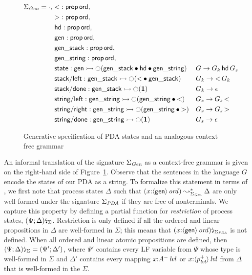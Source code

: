 \begin{figure}
\begin{align*}
 \Sigma_{\it Gen} = \cdot, 
~&{\sf <} : {\sf prop}\,{\sf ord},\\
~&{\sf >} : {\sf prop}\,{\sf ord},\\
~&{\sf hd} : {\sf prop}\,{\sf ord},\\
~&{\sf gen} : {\sf prop}\,{\sf ord},\\
~&{\sf gen\_stack} : {\sf prop}\,{\sf ord},\\
~&{\sf gen\_string} : {\sf prop}\,{\sf ord},\\
~&{\sf state} : {\sf gen} 
       \rightarrowtail {\ocircle}({\sf gen\_stack} \mathbin{\bullet} {\sf hd} 
                         \mathbin{\bullet} {\sf gen\_string})
&& G \rightarrow G_k\,{\sf hd}\,G_s\\
~&{\sf stack/left} : {\sf gen\_stack} 
       \rightarrowtail {\ocircle}({\sf <} \mathbin{\bullet} {\sf gen\_stack})
&& G_k \rightarrow {\sf <}\,G_k \\
~&{\sf stack/done} : {\sf gen\_stack} \rightarrowtail {\ocircle}(\mathbf{1})
&& G_k \rightarrow \epsilon\\
~&{\sf string/left} : 
     {\sf gen\_string} 
       \rightarrowtail {\ocircle}({\sf gen\_string} \mathbin{\bullet} {\sf <})
&& G_s \rightarrow G_s\,{\sf <}\\
~&{\sf string/right} : 
     {\sf gen\_string} 
       \rightarrowtail {\ocircle}({\sf gen\_string} \mathbin{\bullet} {\sf >})
&& G_s \rightarrow G_s\,{\sf >}\\
~&{\sf string/done} : 
     {\sf gen\_string} 
       \rightarrowtail {\ocircle}(\mathbf{1})
&& G_s \rightarrow \epsilon
\end{align*}
\caption{Generative specification of PDA states and an analogous
  context-free grammar}
\label{fig:pda-gen}
\end{figure}

An informal translation of the signature $\Sigma_{\it Gen}$ as a
context-free grammar is given on the right-hand side of
Figure~\ref{fig:pda-gen}. Observe that the sentences in the language
$G$ encode the states of our PDA as a string. To formalize this
statement in terms of \sls, we first note that process states $\Delta$
such that $(x{:}{\langle {\sf gen} \rangle}\,{{\it ord}}) \leadsto^*_{\Sigma_{\it Gen}}
\Delta$ are only well-formed under the signature $\Sigma_{\it PDA}$ if
they are free of nonterminals. We capture this property by defining a
partial function for {\it restriction} of process states,
${(\Psi; \Delta)}{\mbox{\lightning}}_{\Sigma}$. Restriction is only defined if
all the ordered and linear propositions in $\Delta$ are well-formed
in $\Sigma$; this means that ${(x{:}{\langle {\sf
      gen} \rangle}\,{{\it ord}})}{\mbox{\lightning}}_{\Sigma_{\it PDA}}$ is not defined. When all ordered and
linear atomic propositions are defined, then ${(\Psi;
  \Delta)}{\mbox{\lightning}}_{\Sigma} = (\Psi'; \Delta')$, where $\Psi'$ contains every
LF variable from $\Psi$ whose type is well-formed in $\Sigma$ and
$\Delta'$ contains every mapping $x{:}{A^-}\,{{\it lvl}}$ or
$x{:}{\langle {p^+_{\it lvl}} \rangle}\,{{\it lvl}}$ from $\Delta$ that is well-formed in
the $\Sigma$.

